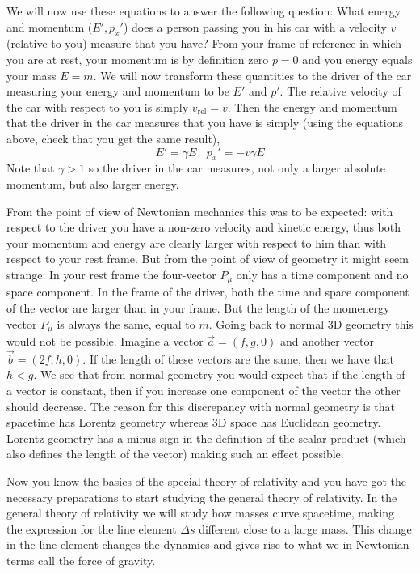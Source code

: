 {\begin{multicols}{2}
We will now use these equations to answer the following question: What energy and momentum $(E',p_x'$) does a person passing you in his car with a velocity $v$ (relative to you) measure that you have? From your frame of reference in which you are at rest, your momentum is by definition zero $p=0$ and you energy equals your mass $E=m$. We will now transform these quantities to the driver of the car measuring your energy and momentum to be $E'$ and $p'$. The relative velocity of the car with respect to you is simply $v_\mathrm{rel}=v$. Then the energy and momentum that the driver in the car measures that you have is simply (using the equations above, check that you get the same result),
\[
E'=\gamma E\ \ \ \ p_x'=-v\gamma E
\]
Note that $\gamma>1$ so the driver in the car measures, not only a larger absolute momentum, but also larger energy. 

From the point of view of Newtonian mechanics this was to be expected: with respect to the driver you have a non-zero velocity and kinetic energy, thus both your momentum  and energy are clearly larger with respect to him than with respect to your rest frame. But from the point of view of geometry it might seem strange: In your rest frame the four-vector $P_\mu$ only has a time component and no space component. In the frame of the driver, both the time and space component of the vector are larger than in your frame. But the length of the momenergy vector $P_\mu$ is always the same, equal to $m$. Going back to normal 3D geometry this would not be possible. Imagine a vector $\vec{a}=(f,g,0)$ and another vector $\vec{b}=(2f,h,0)$. If the length of these vectors are the same, then we have that $h<g$. We see that from normal geometry you would expect that if the length of a vector is constant, then if you increase one component of the vector the other should decrease. The reason for this discrepancy with normal geometry is that spacetime has Lorentz geometry whereas 3D space has Euclidean geometry. Lorentz geometry has a minus sign in the definition of the scalar product (which also defines the length of the vector) making such an effect possible.

Now you know the basics of the special theory of relativity and you have got the necessary preparations to start studying the general theory of relativity. In the general theory of relativity we will study how masses curve spacetime, making the expression for the line element $\Delta s$ different close to a large mass. This change in the line element changes the dynamics and gives rise to what we in Newtonian terms call the force of gravity.


\end{multicols}}

